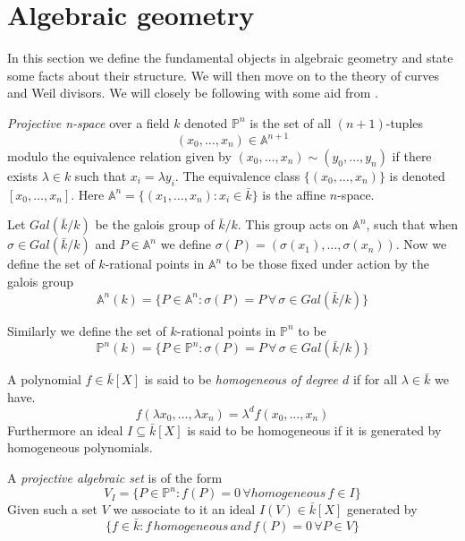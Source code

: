 
\section{Algebraic geometry}
In this section we define the fundamental objects in algebraic geometry and state
some facts about their structure. We will then move on to the theory of
curves and Weil divisors. We will closely be following \cite{AEC} with some aid from
\cite{Fulton}.

\begin{mydef}
\emph{Projective n-space} over a field $k$ denoted $\mathbb{P}^n$ is the set 
of all $(n+1)$-tuples $$(x_0,\ldots,x_n)\in\mathbb{A}^{n+1}$$
modulo the equivalence relation given by $(x_0,\ldots,x_n)\sim(y_0,\ldots,y_n)$ 
if there exists $\lambda\in k$ such that $x_i=\lambda y_i$.
The equivalence class $\{(x_0,\ldots,x_n)\}$ is denoted $[x_0,\ldots,x_n]$.
Here $\mathbb{A}^n = \{ (x_1,\ldots,x_n) : x_i \in \bar{k} \} $ is the affine $n$-space.
\end{mydef}

Let $Gal(\bar{k}/k)$ be the galois group of $\bar{k}/k$. This group acts on
$\mathbb{A}^n$, such that when $\sigma \in Gal(\bar{k}/k)$ and $P\in \mathbb{A}^n$
we define $\sigma(P) = (\sigma(x_1),\ldots,\sigma(x_n))$. Now we define
the set of $k$-rational points in $\mathbb{A}^n$ to be those fixed under action by
the galois group
$$ \mathbb{A}^n(k) = \{ P \in \mathbb{A}^n : \sigma(P) = P\, \forall\, \sigma \in
Gal(\bar{k}/k) \} $$

Similarly we define the set of $k$-rational points in $\mathbb{P}^n$ to be
$$ \mathbb{P}^n(k) = \{ P \in \mathbb{P}^n : \sigma(P) = P\, \forall\, \sigma \in 
Gal(\bar{k}/k) \} $$

\begin{mydef}
 A polynomial $f\in\bar{k}[X]$ is said to be \emph{homogeneous of degree $d$} if for all
$\lambda\in\bar{k}$ we have.
$$f(\lambda x_0,\ldots,\lambda x_n) = \lambda^d f(x_0,\ldots,x_n)$$
Furthermore an ideal $I\subseteq\bar{k}[X]$ is said to be homogeneous if it is generated
by homogeneous polynomials.
\end{mydef}

\begin{mydef}
 A \emph{projective algebraic set} is of the form
$$ V_I = \{ P\in \mathbb{P}^n : f(P) = 0\, \forall homogeneous\, f\in I \} $$
Given such a set $V$ we associate to it an ideal $I(V) \in \bar{k}[X]$ generated by
$$ \{f\in\bar{k} : f\, homogeneous\, and\, f(P)=0\, \forall P\in V \} $$
\end{mydef}

